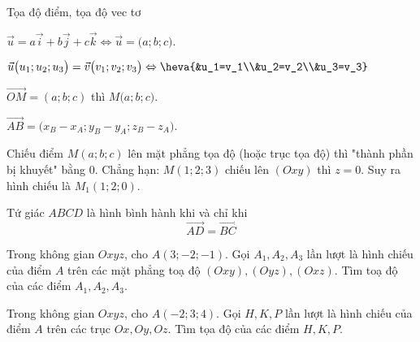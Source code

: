 \begin{dang}{Tọa độ điểm, tọa độ vec tơ}
	\begin{listEX}[2]
		\item [\ding{172}] $\vec{u}=a\vec{i}+b\vec{j}+c\vec{k} \Leftrightarrow \vec{u}=\big(a;b;c\big)$.
		\item [\ding{173}] $\vec{u}\big(u_1;u_2;u_3\big)=\vec{v}\big(v_1;v_2;v_3\big) \Leftrightarrow \heva{&u_1=v_1\\&u_2=v_2\\&u_3=v_3}$
		\item [\ding{174}] $\vec{OM}=(a;b;c)$ thì $M\big(a;b;c\big)$.
		\item [\ding{175}] $\vec{AB}=\big(x_B-x_A;y_B-y_A;z_B-z_A \big).$
		\item [\ding{176}] Chiếu điểm $M(a;b;c)$ lên mặt phẳng tọa độ (hoặc trục tọa độ) thì "thành phần bị khuyết" bằng $0$. Chẳng hạn: $M(1;2;3)$ chiếu lên $(Oxy)$ thì $z=0$. Suy ra hình chiếu là $M_1(1;2;0)$.
		\item [\ding{177}] Tứ giác $ABCD$ là hình bình hành khi và chỉ khi $$\vec{AD}=\vec{BC}$$
	\end{listEX}
\end{dang}
\setcounter{vd}{0}
\begin{vd}
	Trong không gian $Oxyz$, cho $A(3 ;-2 ;-1)$. Gọi $ A_1, A_2, A_3$ lần lượt là hình chiếu của điểm $A$ trên các mặt phẳng toạ độ $(Oxy),(Oyz),(Oxz)$. Tìm toạ độ của các điểm $ A_1, A_2, A_3$.
\end{vd}
\begin{vd}
	Trong không gian $Oxyz$, cho $A(-2;3;4)$. Gọi $H, K, P$ lần lượt là hình chiếu của điểm $A$ trên các trục $Ox, Oy, Oz$. Tìm tọa độ của các điểm $H,K,P$.
\end{vd}
